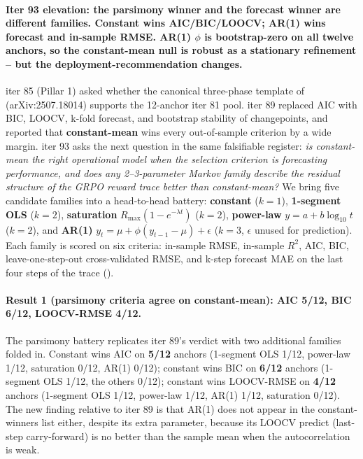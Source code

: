 \paragraph{Iter 93 elevation: the parsimony winner and the forecast
winner are different families.  Constant wins AIC/BIC/LOOCV; AR(1) wins
forecast and in-sample RMSE.  AR(1) $\phi$ is bootstrap-zero on all
twelve anchors, so the constant-mean null is robust as a stationary
refinement -- but the deployment-recommendation changes.}
\label{par:scaling-iter93}

iter 85 (Pillar 1) asked whether the canonical three-phase template of
\citet{nimmaturi2025predictive} (arXiv:2507.18014) supports the
12-anchor iter 81 pool.  iter 89 replaced AIC with BIC, LOOCV, k-fold
forecast, and bootstrap stability of changepoints, and reported that
\textbf{constant-mean} wins every out-of-sample criterion by a wide
margin.  iter 93 asks the next question in the same falsifiable
register: \emph{is constant-mean the right operational model when the
selection criterion is forecasting performance, and does any
2--3-parameter Markov family describe the residual structure of the
GRPO reward trace better than constant-mean?} We bring five candidate
families into a head-to-head battery: \textbf{constant} ($k=1$),
\textbf{1-segment OLS} ($k=2$), \textbf{saturation}
$R_\mathrm{max}(1-e^{-\lambda t})$ ($k=2$), \textbf{power-law}
$y = a + b \log_{10} t$ ($k=2$), and \textbf{AR(1)} $y_t = \mu +
\phi (y_{t-1}-\mu) + \epsilon$ ($k=3$, $\epsilon$ unused for
prediction).  Each family is scored on six criteria: in-sample RMSE,
in-sample $R^2$, AIC, BIC, leave-one-step-out cross-validated RMSE,
and k-step forecast MAE on the last four steps of the trace
().

\paragraph{Result 1 (parsimony criteria agree on constant-mean): AIC
5/12, BIC 6/12, LOOCV-RMSE 4/12.}
\label{par:scaling-iter93-parsimony}

The parsimony battery replicates iter 89's verdict with two additional
families folded in.  Constant wins AIC on \textbf{5/12} anchors
(1-segment OLS 1/12, power-law 1/12, saturation 0/12, AR(1) 0/12);
constant wins BIC on \textbf{6/12} anchors (1-segment OLS 1/12, the
others 0/12); constant wins LOOCV-RMSE on \textbf{4/12} anchors
(1-segment OLS 1/12, power-law 1/12, AR(1) 1/12, saturation 0/12).
The new finding relative to iter 89 is that AR(1) does not appear in
the constant-winners list either, despite its extra parameter, because
its LOOCV predict (last-step carry-forward) is no better than the
sample mean when the autocorrelation is weak.

